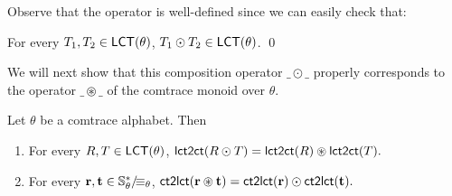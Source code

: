 \documentclass{llncs}
\begin{document}
Observe that the operator is well-defined since  we can easily check that:
\begin{proposition}
For every $T_1,T_2\in \mathsf{LCT}(\theta)$, $T_1\odot T_2 \in \mathsf{LCT}(\theta)$. \qed 
\end{proposition}

We will next show that this composition operator $\_\odot\_$ properly corresponds to the operator $\_\circledast\_$  of the comtrace monoid over $\theta$.

\begin{proposition}  Let $\theta$ be a comtrace alphabet. Then  
\begin{enumerate}
\item For every $R,T \in \mathsf{LCT}(\theta)$, $\mathsf{lct2ct}(R \odot T) = \mathsf{lct2ct}(R) \circledast \mathsf{lct2ct}(T).$

\item For every $\mathbf{r},\mathbf{t} \in {\mathbb{S}_\theta^*}/\!{\equiv_{\theta}}$,
$\mathsf{ct2lct}(\mathbf{r}\circledast \mathbf{t})= \mathsf{ct2lct}(\mathbf{r})\odot\mathsf{ct2lct}(\mathbf{t}).$
\end{enumerate}
\label{prop:hom1}
\end{proposition}
\end{document}
